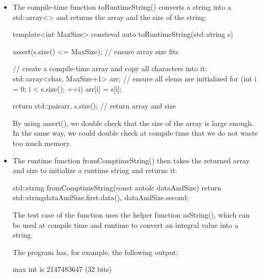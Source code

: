 \begin{itemize}
\item 
The compile-time function toRuntimeString() converts a string into a std::array<> and returns the array and the size of the string:

\begin{cpp}
template<int MaxSize>
consteval auto toRuntimeString(std::string s)
{
	assert(s.size() <= MaxSize); // ensure array size fits
	
	// create a compile-time array and copy all characters into it:
	std::array<char, MaxSize+1> arr{}; // ensure all elems are initialized
	for (int i = 0; i < s.size(); ++i) {
		arr[i] = s[i];
	}
	
	return std::pair{arr, s.size()}; // return array and size
}
\end{cpp}

By using assert(), we double check that the size of the array is large enough. In the same way, we could double check at compile time that we do not waste too much memory.

\item 
The runtime function fromComptimeString() then takes the returned array and size to initialize a runtime string and returns it:

\begin{cpp}
std::string fromComptimeString(const auto& dataAndSize)
{
	return std::string{dataAndSize.first.data(),
					   dataAndSize.second};
}
\end{cpp}

The test case of the function uses the helper function asString(), which can be used at compile time and runtime to convert an integral value into a string.

The program has, for example, the following output:

\begin{shell}
max int is 2147483647 (32 bits)
\end{shell}

\end{itemize}






